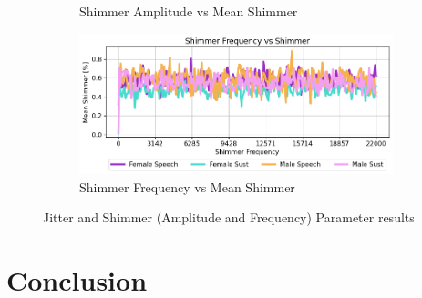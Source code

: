 \documentclass[final,5p,times,twocolumn]{elsarticle}
\begin{document}
\begin{figure}[!htpb]
{\begin{subfigure}[b]{.49\textwidth}
		\caption{Shimmer Amplitude vs Mean Shimmer}
		\label{fig:results_shimmer_amplitude_shimmer}
	\end{subfigure}
	\begin{subfigure}[b]{.49\textwidth}
		\centering
		\includegraphics[width=.98\textwidth]{shimmer_frequency_shimmer.png}
		\caption{Shimmer Frequency vs Mean Shimmer}
        \label{fig:results_shimmer_frequency_shimmer}
	\end{subfigure}
	}
	\caption{Jitter and Shimmer (Amplitude and Frequency) Parameter results}
\end{figure}

\section{Conclusion}
\end{document}
